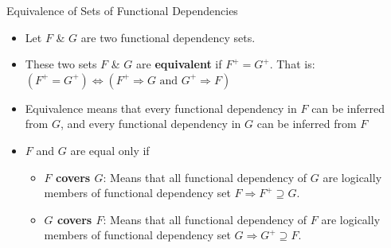 \documentclass[aspectratio=169, xcolor=dvipsnames]{beamer}
\begin{document}
\begin{frame}{Equivalence of Sets of Functional Dependencies}
    \begin{itemize}[<+->]
        \item Let $F$ \& $G$ are two functional dependency sets.
        \item These two sets $F$ \& $G$ are \textbf{equivalent} if $F^+ = G^+$. That is: $(F^+ = G^+) \Leftrightarrow (F^+ \Rightarrow G \text{ and } G^+ \Rightarrow F)$
        \item Equivalence means that every functional dependency in $F$ can be inferred from $G$, and every functional dependency in $G$ can be inferred from $F$
        \item $F$ and $G$ are equal only if
        \begin{itemize}
            \item[$\triangleright$] \textbf{$F$ covers $G$}: Means that all functional dependency of $G$ are logically members of functional dependency set $F \Rightarrow F^+ \supseteq G$.
            \item[$\triangleright$] \textbf{$G$ covers $F$}: Means that all functional dependency of $F$ are logically members of functional dependency set $G \Rightarrow G^+ \supseteq F$.
        \end{itemize}
    \end{itemize}
\end{frame}
\end{document}
